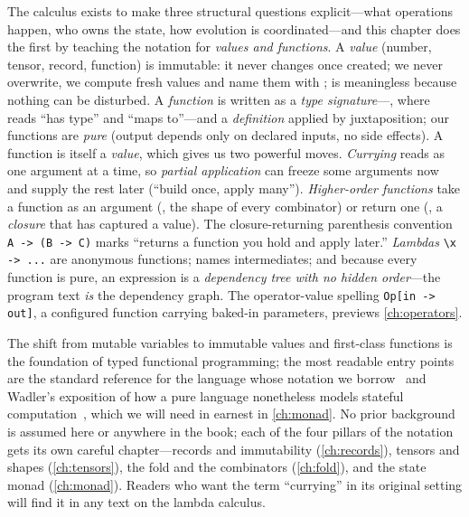 \summarysection
The calculus exists to make three structural questions explicit---what operations
happen, who owns the state, how evolution is coordinated---and this chapter does
the first by teaching the notation for \emph{values and functions}. A
\emph{value} (number, tensor, record, function) is immutable: it never changes
once created; we never overwrite, we compute fresh values and name them with
;  is meaningless because nothing can be disturbed. A
\emph{function} is written as a \emph{type signature}---, where
\code{::} reads ``has type'' and \code{->} ``maps to''---and a \emph{definition}
applied by juxtaposition; our functions are \emph{pure} (output depends only on
declared inputs, no side effects). A function is itself a \emph{value}, which
gives us two powerful moves. \emph{Currying} reads  as one
argument at a time, so \emph{partial application} can freeze some arguments now
and supply the rest later (``build once, apply many''). \emph{Higher-order
functions} take a function as an argument (, the shape of every
combinator) or return one (, a \emph{closure} that has captured a
value). The closure-returning parenthesis convention
\lstinline[style=l4style]|A -> (B -> C)| marks ``returns a function you hold and
apply later.'' \emph{Lambdas} \lstinline[style=l4style]|\x -> ...| are anonymous
functions;  names intermediates; and because every function is pure, an
expression is a \emph{dependency tree with no hidden order}---the program text
\emph{is} the dependency graph. The operator-value spelling
\lstinline[style=l4style]|Op[in -> out]|, a configured function carrying baked-in
parameters, previews \cref{ch:operators}.

\furtherreading
The shift from mutable variables to immutable values and first-class functions is
the foundation of typed functional programming; the most readable entry points are
the standard reference for the language whose notation we borrow~\citep{peytonjones2003}
and Wadler's exposition of how a pure language nonetheless models stateful
computation~\citep{wadler1995monads}, which we will need in earnest in
\cref{ch:monad}. No prior background is assumed here or anywhere in the book; each
of the four pillars of the notation gets its own careful chapter---records and
immutability (\cref{ch:records}), tensors and shapes (\cref{ch:tensors}), the fold
and the combinators (\cref{ch:fold}), and the state monad (\cref{ch:monad}).
Readers who want the term ``currying'' in its original setting will find it in any
text on the lambda calculus.

